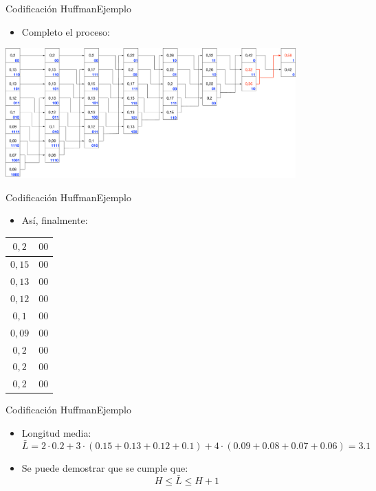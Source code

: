 \documentclass[10pt,compress]{beamer} %
\begin{document}
\begin{frame}{Codificación Huffman}{Ejemplo}
  \begin{itemize}
    \item Completo el proceso:
  \end{itemize}
  \centering \includegraphics[height=5cm]{./Figuras/Huffman10.pdf}
\end{frame}

\begin{frame}{Codificación Huffman}{Ejemplo}
  \begin{itemize}
    \item Así, finalmente:
  \end{itemize}

  \begin{tabular}{|c|c|}
    \hline
    $0,2$ & $00$ \\
    \hline
    $0,15$ & $00$ \\
    \hline
    $0,13$ & $00$ \\
    \hline
    $0,12$ & $00$ \\
    \hline
    $0,1$ & $00$ \\
    \hline
    $0,09$ & $00$ \\
    \hline
    $0,2$ & $00$ \\
    \hline
    $0,2$ & $00$ \\
    \hline
    $0,2$ & $00$ \\
    \hline
  \end{tabular}
\end{frame}

\begin{frame}{Codificación Huffman}{Ejemplo}
  \begin{itemize}
    \item Longitud media:
    \begin{displaymath}
      \bar{L} = 2\cdot 0.2 + 3 \cdot (0.15 + 0.13 + 0.12 + 0.1) + 4 \cdot (0.09 + 0.08 + 0.07 + 0.06) = 3.1
    \end{displaymath}
    \item Se puede demostrar que se cumple que:
    \begin{displaymath}
      H \leq \bar{L} \leq H+1
    \end{displaymath}
  \end{itemize}

\end{frame}
\end{document}
